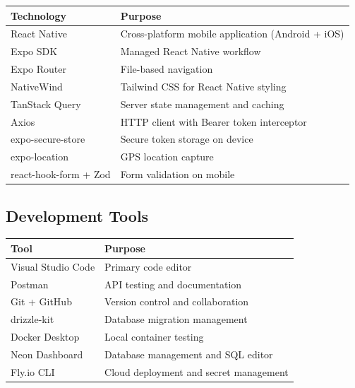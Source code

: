 \documentclass[12pt,a4paper]{article}
\begin{document}
\vspace{4pt}
\begin{center}
\renewcommand{\arraystretch}{1.35}
\begin{tabular}{@{} L{3.6cm} L{9.8cm} @{}}
\toprule
{}
\textbf{Technology} & \textbf{Purpose} \\
\midrule
React Native             & Cross-platform mobile application (Android + iOS) \\
Expo SDK                 & Managed React Native workflow \\
Expo Router              & File-based navigation \\
NativeWind               & Tailwind CSS for React Native styling \\
TanStack Query           & Server state management and caching \\
Axios                    & HTTP client with Bearer token interceptor \\
expo-secure-store        & Secure token storage on device \\
expo-location            & GPS location capture \\
react-hook-form + Zod    & Form validation on mobile \\
\bottomrule
\end{tabular}
\end{center}

\subsection{Development Tools}

\vspace{4pt}
\begin{center}
\renewcommand{\arraystretch}{1.35}
\begin{tabular}{@{} L{3.6cm} L{9.8cm} @{}}
\toprule
{}
\textbf{Tool} & \textbf{Purpose} \\
\midrule
Visual Studio Code   & Primary code editor \\
Postman              & API testing and documentation \\
Git + GitHub         & Version control and collaboration \\
drizzle-kit          & Database migration management \\
Docker Desktop       & Local container testing \\
Neon Dashboard       & Database management and SQL editor \\
Fly.io CLI           & Cloud deployment and secret management \\
\bottomrule
\end{tabular}
\end{center}
\end{document}
